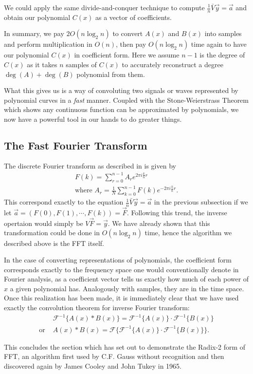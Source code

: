 \documentclass[../article.tex]{subfiles}
\begin{document}
We could apply the same divide-and-conquer technique to compute $\frac{1}{n}\bar{V}\vec{y} = \vec{a}$ and obtain our polynomial $C(x)$ as a vector of coefficients.

In summary, we pay $2O(n\log_2{n})$ to convert $A(x)$ and $B(x)$ into samples and perform multiplication in $O(n)$, then pay $O(n\log_2{n})$ time again to have our polynomial $C(x)$ in coefficient form. Here we assume $n-1$ is the degree of $C(x)$ as it takes $n$ samples of $C(x)$ to accurately reconstruct a degree $\deg(A)+\deg(B)$ polynomial from them.

What this gives us is a way of convoluting two signals or waves represented by polynomial curves in a \emph{fast} manner. Coupled with the Stone-Weierstrass Theorem which shows any continuous function can be approximated by polynomials, we now have a powerful tool in our hands to do greater things.

\subsection{The Fast Fourier Transform}


The discrete Fourier transform as described in \cite{stein_shakarchi_2003} is given by
\begin{eqnarray*}
F(k) = \displaystyle \sum_{r=0}^{n-1} A_r e^{2\pi i\frac{k}{n}r}\\
\text{where } A_r = \frac{1}{N} \displaystyle \sum_{k=0}^{n-1} F(k) e^{-2\pi i\frac{k}{n}r}.
\end{eqnarray*}
This correspond exactly to the equation $\frac{1}{n}\bar{V}\vec{y}=\vec{a}$ in the previous subsection if we let $\vec{a} = (F(0),F(1),\cdots,F(k)) = \vec{F}$. Following this trend, the inverse opertaion would simply be $V\vec{F} = \vec{y}$. We have already shown that this transformation could be done in $O(n\log_2n)$ time, hence the algorithm we described above is the FFT itself.

In the case of converting representations of polynomials, the coefficient form corresponds exactly to the frequency space one would conventionally denote in Fourier analysis, as a coefficient vector tells us exactly how much of each power of $x$ a given polynomial has. Analogously with samples, they are in the time space. Once this realization has been made, it is immediately clear that we have used exactly the convolution theorem for inverse Fourier transform:
\begin{eqnarray*}
&\mathscr{F}^{-1}\{A(x)*B(x)\} =\mathscr{F}^{-1}\{A(x)\}\cdot\mathscr{F}^{-1}\{B(x)\}\\
\text{or } &A(x)*B(x) =\mathscr{F}\{\mathscr{F}^{-1}\{A(x)\}\cdot\mathscr{F}^{-1}\{B(x)\}\}.
\end{eqnarray*}

This concludes the section which has set out to demonstrate the Radix-2 form of FFT, an algorithm first used by C.F. Gauss without recognition and then discovered again by James Cooley and John Tukey in 1965.
\end{document}

